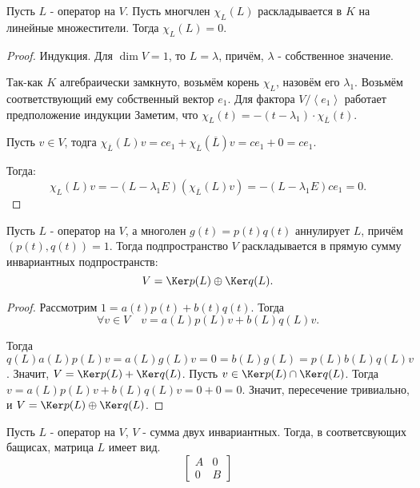 \begin{theorem} \thmslashn

    Пусть $L$ - оператор на $V$. Пусть многчлен $\chi_{L}(L)$ раскладывается в $K$ на линейные множестители. Тогда $\chi_{L}(L) = 0$.
    \begin{proof} \thmslashn
    
        Индукция. Для $\dim V = 1$, то $L = \lambda$, причём,  $\lambda$ - собственное значение.

        Так-как $K$ алгебраически замкнуто, возьмём корень $\chi_{L}$, назовём его $\lambda_1$. Возьмём соответствующий ему собственный вектор $e_1$. Для фактора $V / \left<e_1\right>$ работает предположение индукции  Заметим, что $\chi_{L}(t) = -(t - \lambda_1) \cdot \chi_{\overline{L}}(t)$.

        Пусть $v\in V$, тодга $\chi_{\overline{L}}(L)v = ce_1 + \chi_{\overline{L}}(\overline{L})v = ce_{1} + 0 = ce_{1}$.

        Тогда:
        \[ \chi_{L}(L)v = -(L-\lambda_1E)(\chi_{\overline{L}}(L)v) = -(L-\lambda_1E)ce_1 = 0 .\] 
    \end{proof}
\end{theorem}
\begin{theorem} \thmslashn

    Пусть $L$ - оператор на $V$, а многолен $g(t) = p(t)q(t)$ аннулирует $L$, причём $(p(t), q(t)) = 1$. Тогда подпространство $V$ раскладывается в прямую сумму инвариантных подпространств:
    \[ V = \Ker p(L) \oplus \Ker q(L) .\]
    \begin{proof} \thmslashn
    
        Рассмотрим $1 = a(t)p(t) + b(t)q(t)$. Тогда
        \[ \forall{v\in V}\quad v = a(L)p(L)v + b(L)q(L)v .\]

        Тогда $q(L)a(L)p(L)v = a(L)g(L)v = 0 = b(L)g(L) = p(L)b(L)q(L)v$. Значит, $V = \Ker p(L) + \Ker q(L)$. Пусть $v\in \Ker p(L)\cap \Ker q(L)$. Тогда $v = a(L)p(L)v + b(L)q(L)v = 0 + 0 = 0$. Значит, пересечение тривиально, и $V = \Ker p(L) \oplus \Ker q(L)$.
    \end{proof}
\end{theorem}
\begin{statement} \thmslashn

    Пусть $L$ - оператор на $V$, $V$ - сумма двух инвариантных. Тогда, в соответсвующих бащисах, матрица $L$ имеет вид.
    \begin{equation*}
        \begin{bmatrix} 
            A & 0\\
            0 & B
        \end{bmatrix} 
    \end{equation*}
\end{statement}
